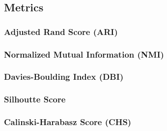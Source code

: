 \subsection{Metrics}

\subsubsection{Adjusted Rand Score (ARI)}

\subsubsection{Normalized Mutual Information (NMI)}

\subsubsection{Davies-Boulding Index (DBI)}

\subsubsection{Silhoutte Score}

\subsubsection{Calinski-Harabasz Score (CHS)}